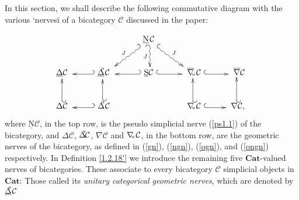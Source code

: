 \documentclass[]{amsart}
\begin{document}
In this section, we shall describe the following commutative diagram with the various `nervesï of a
bicategory ${\ensuremath{\mathcal{C}}}$ discussed in the paper:

\begin{equation}\label{dia}
\xymatrix{&&\ \  {\ensuremath{\underline{\mathrm{N}}}}_{_\text{}}{\ensuremath{\mathcal{C}}} \ar@{_{(}~>}@<1.5pt>_{J}[d]\ar@{_{(}~>}@<1.5pt>[dl]_J\ \
\ar@{^{(}~>}@<-1.5pt>[dr]^J&&\\ {\ensuremath{\underline{\Delta}}}{\ensuremath{\mathcal{C}}}\ & \ar@{_{(}->}@<1.5pt>[l]\
{\ensuremath{\underline{\Delta}}}\hspace{-4pt}^{^\mathrm{u}}{\ensuremath{\mathcal{C}}}_{_\text{}}\ &  \ar@{_{(}->}@<1.5pt>[l]\
\underline{\mathrm{S}}{\ensuremath{\mathcal{C}}} \ \ar@{^{(}->}@<-1.5pt>[r] &\
\overline{\nabla}\hspace{-2.5pt}_{^{_\mathrm{u}}}{\ensuremath{\mathcal{C}}}\  \ar@{^{(}->}@<-1.5pt>[r]& \
\overline{\nabla}{\ensuremath{\mathcal{C}}}
\\ \ar@{_{(}->}@<1.5pt>[u]{\ensuremath{\Delta}}{\ensuremath{\mathcal{C}}}\
&\ar@{_{(}->}@<1.5pt>[l]\ {\ensuremath{\Delta}}\hspace{-4pt}^{^\mathrm{u}}{\ensuremath{\mathcal{C}}} \ \ar@{_{(}->}@<1.5pt>[u] &&\
\nabla\hspace{-2.5pt}_{^{_\mathrm{u}}}{\ensuremath{\mathcal{C}}} \ \ar@{_{(}->}@<1.5pt>[u] \ar@{^{(}->}@<-1.5pt>[r] & \
\nabla{\ensuremath{\mathcal{C}}}, \ \ar@{_{(}->}@<1.5pt>[u]}
\end{equation}
where $\underline{\ensuremath{\mathrm{N}}}{\ensuremath{\mathcal{C}}}$, in the top row, is the pseudo simplicial nerve (\ref{ps1.1}) of the
bicategory, and ${\ensuremath{\Delta}}{\ensuremath{\mathcal{C}}}$, ${\ensuremath{\Delta}}\hspace{-4pt}^{^\mathrm{u}}\!{\ensuremath{\mathcal{C}}}$, $\nabla{\ensuremath{\mathcal{C}}}$ and
$\nabla\hspace{-2.5pt}_{^{_\mathrm{u}}}{\ensuremath{\mathcal{C}}}$, in the bottom row, are the geometric nerves  of the
bicategory, as defined in (\ref{gn}), (\ref{ngn}), (\ref{ogn}), and (\ref{ongn}) respectively. In
Definition \ref{1.2.18'} we introduce the remaining five ${\ensuremath{\mathbf{Cat}}}$-valued nerves of bicategories.
These associate to every bicategory ${\ensuremath{\mathcal{C}}}$ simplicial objects in ${\ensuremath{\mathbf{Cat}}}$:  Those called its {\em
unitary categorical geometric nerves}, which are denoted by ${\ensuremath{\underline{\Delta}}}\hspace{-4pt}^{^\mathrm{u}}{\ensuremath{\mathcal{C}}}$
\end{document}
